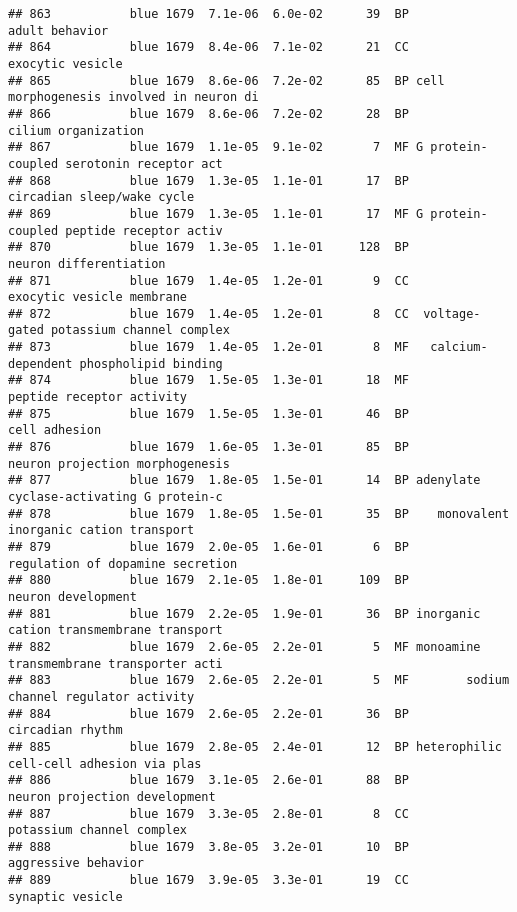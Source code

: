 \documentclass[]{article}
\begin{document}
\begin{verbatim}
## 863           blue 1679  7.1e-06  6.0e-02      39  BP                           adult behavior
## 864           blue 1679  8.4e-06  7.1e-02      21  CC                         exocytic vesicle
## 865           blue 1679  8.6e-06  7.2e-02      85  BP cell morphogenesis involved in neuron di
## 866           blue 1679  8.6e-06  7.2e-02      28  BP                      cilium organization
## 867           blue 1679  1.1e-05  9.1e-02       7  MF G protein-coupled serotonin receptor act
## 868           blue 1679  1.3e-05  1.1e-01      17  BP               circadian sleep/wake cycle
## 869           blue 1679  1.3e-05  1.1e-01      17  MF G protein-coupled peptide receptor activ
## 870           blue 1679  1.3e-05  1.1e-01     128  BP                   neuron differentiation
## 871           blue 1679  1.4e-05  1.2e-01       9  CC                exocytic vesicle membrane
## 872           blue 1679  1.4e-05  1.2e-01       8  CC  voltage-gated potassium channel complex
## 873           blue 1679  1.4e-05  1.2e-01       8  MF   calcium-dependent phospholipid binding
## 874           blue 1679  1.5e-05  1.3e-01      18  MF                peptide receptor activity
## 875           blue 1679  1.5e-05  1.3e-01      46  BP                            cell adhesion
## 876           blue 1679  1.6e-05  1.3e-01      85  BP          neuron projection morphogenesis
## 877           blue 1679  1.8e-05  1.5e-01      14  BP adenylate cyclase-activating G protein-c
## 878           blue 1679  1.8e-05  1.5e-01      35  BP    monovalent inorganic cation transport
## 879           blue 1679  2.0e-05  1.6e-01       6  BP         regulation of dopamine secretion
## 880           blue 1679  2.1e-05  1.8e-01     109  BP                       neuron development
## 881           blue 1679  2.2e-05  1.9e-01      36  BP inorganic cation transmembrane transport
## 882           blue 1679  2.6e-05  2.2e-01       5  MF monoamine transmembrane transporter acti
## 883           blue 1679  2.6e-05  2.2e-01       5  MF        sodium channel regulator activity
## 884           blue 1679  2.6e-05  2.2e-01      36  BP                         circadian rhythm
## 885           blue 1679  2.8e-05  2.4e-01      12  BP heterophilic cell-cell adhesion via plas
## 886           blue 1679  3.1e-05  2.6e-01      88  BP            neuron projection development
## 887           blue 1679  3.3e-05  2.8e-01       8  CC                potassium channel complex
## 888           blue 1679  3.8e-05  3.2e-01      10  BP                      aggressive behavior
## 889           blue 1679  3.9e-05  3.3e-01      19  CC                         synaptic vesicle

\end{verbatim}
\end{document}
